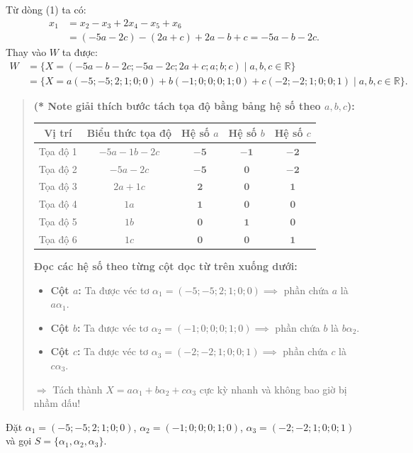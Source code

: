 \documentclass[12pt,a4paper]{article}
\newcommand{\R}{\mathbb{R}}
\begin{document}
Từ dòng (1) ta có:
\begin{align*}
x_1 &= x_2 - x_3 + 2x_4 - x_5 + x_6 \\
    &= (-5a - 2c) - (2a + c) + 2a - b + c = -5a - b - 2c.
\end{align*}
Thay vào $W$ ta được:
\begin{align*}
W &= \{ X = (-5a - b - 2c; -5a - 2c; 2a + c; a; b; c) \mid a, b, c \in \R \} \\
  &= \{ X = a(-5; -5; 2; 1; 0; 0) + b(-1; 0; 0; 0; 1; 0) + c(-2; -2; 1; 0; 0; 1) \mid a, b, c \in \R \}.
\end{align*}
\begin{quote}
\small\textbf{(* Note giải thích bước tách tọa độ bằng bảng hệ số theo $a, b, c$):}
\begin{center}
\renewcommand{\arraystretch}{1.15}
\setlength{\tabcolsep}{6pt}
\footnotesize
\begin{tabular}{|c|c|c|c|c|}
\hline
\textbf{Vị trí} & \textbf{Biểu thức tọa độ} & \textbf{Hệ số $a$} & \textbf{Hệ số $b$} & \textbf{Hệ số $c$} \\
\hline
Tọa độ 1 & $-5a - 1b - 2c$ & $\mathbf{-5}$ & $\mathbf{-1}$ & $\mathbf{-2}$ \\
\hline
Tọa độ 2 & $-5a - 2c$ & $\mathbf{-5}$ & $\mathbf{0}$ & $\mathbf{-2}$ \\
\hline
Tọa độ 3 & $2a + 1c$ & $\mathbf{2}$ & $\mathbf{0}$ & $\mathbf{1}$ \\
\hline
Tọa độ 4 & $1a$ & $\mathbf{1}$ & $\mathbf{0}$ & $\mathbf{0}$ \\
\hline
Tọa độ 5 & $1b$ & $\mathbf{0}$ & $\mathbf{1}$ & $\mathbf{0}$ \\
\hline
Tọa độ 6 & $1c$ & $\mathbf{0}$ & $\mathbf{0}$ & $\mathbf{1}$ \\
\hline
\end{tabular}
\end{center}
\textbf{Đọc các hệ số theo từng cột dọc từ trên xuống dưới:}
\begin{itemize}[noitemsep,topsep=2pt]
\item \textbf{Cột $a$:} Ta được véc tơ $\alpha_1 = (-5; -5; 2; 1; 0; 0) \implies$ phần chứa $a$ là $a\alpha_1$.
\item \textbf{Cột $b$:} Ta được véc tơ $\alpha_2 = (-1; 0; 0; 0; 1; 0) \implies$ phần chứa $b$ là $b\alpha_2$.
\item \textbf{Cột $c$:} Ta được véc tơ $\alpha_3 = (-2; -2; 1; 0; 0; 1) \implies$ phần chứa $c$ là $c\alpha_3$.
\end{itemize}
$\Rightarrow$ Tách thành $X = a\alpha_1 + b\alpha_2 + c\alpha_3$ cực kỳ nhanh và không bao giờ bị nhầm dấu!
\end{quote}
Đặt $\alpha_1 = (-5; -5; 2; 1; 0; 0)$, $\alpha_2 = (-1; 0; 0; 0; 1; 0)$, $\alpha_3 = (-2; -2; 1; 0; 0; 1)$ và gọi $S = \{ \alpha_1, \alpha_2, \alpha_3 \}$.
\end{document}
